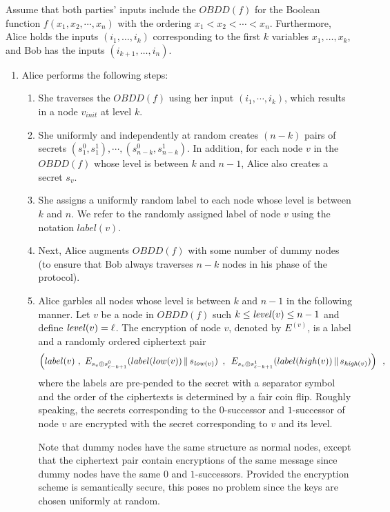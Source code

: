 \begin{flushleft}
Assume that both parties' inputs include the $OBDD(f)$ for the Boolean
function $f(x_{1},x_{2},\cdots,x_{n})$ with the ordering $x_{1}<x_{2}<\cdots<x_{n}$.
Furthermore, Alice holds the inputs $(i_{1},\ldots,i_{k})$ corresponding
to the first $k$ variables $x_{1},\ldots,x_{k}$, and Bob has the
inputs $(i_{k+1},\ldots,i_{n})$.
\par\end{flushleft}
\begin{enumerate}
\item Alice performs the following steps: 

\begin{enumerate}
\item She traverses the $OBDD(f)$ using her input $(i_{1},\cdots,i_{k})$,
which results in a node $v_{init}$ at level $k$.
\item She uniformly and independently at random creates $(n-k)$ pairs of
secrets $(s_{1}^{0},s_{1}^{1}),\cdots,(s_{n-k}^{0},s_{n-k}^{1})$.
In addition, for each node $v$ in the $OBDD(f)$ whose level is between
$k$ and $n-1$, Alice also creates a secret $s_{v}$.
\item She assigns a uniformly random label to each node whose level is between
$k$ and $n$. We refer to the randomly assigned label of node $v$
using the notation $label(v)$.
\item Next, Alice augments $OBDD(f)$ with some number of dummy nodes (to
ensure that Bob always traverses $n-k$ nodes in his phase of the
protocol).
\item Alice garbles all nodes whose level is between $k$ and $n-1$ in
the following manner. Let $v$ be a node in $OBDD(f)$ such $k\leq{\it level}(v)\leq n-1$
and define ${\it level}(v)=\ell$. The encryption of node $v$, denoted
by $E^{(v)}$, is a label and a randomly ordered ciphertext pair \[
\left(label(v)\,\,,\,\, E_{s_{v}\oplus s_{\ell-k+1}^{0}}(label(low(v))\,\|\, s_{{\it low}(v)})\,\,\,,\,\,\, E_{s_{v}\oplus s_{\ell-k+1}^{1}}(label(high(v))\,\|\, s_{{\it high}(v)})\right)\,\,\,,\]
 where the labels are pre-pended to the secret with a separator symbol
and the order of the ciphertexts is determined by a fair coin flip.
Roughly speaking, the secrets corresponding to the $0$-successor
and $1$-successor of node $v$ are encrypted with the secret corresponding
to $v$ and its level.


Note that dummy nodes have the same structure as normal nodes, except
that the ciphertext pair contain encryptions of the same message since
dummy nodes have the same $0$ and $1$-successors. Provided the encryption
scheme is semantically secure, this poses no problem since the keys
are chosen uniformly at random.


\end{enumerate}
\end{enumerate}
